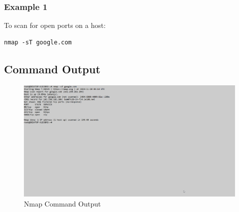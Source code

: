 \documentclass{article}
\begin{document}
\subsubsection{Example 1}
To scan for open ports on a host:
\begin{verbatim}
nmap -sT google.com
\end{verbatim}

\subsection{Command Output}
\begin{figure}[htbp]
    \centering
    \includegraphics[]{nmap.png}
    \caption{Nmap Command Output}
    \label{fig:nmap_output}
\end{figure}
\clearpage  %
\end{document}
